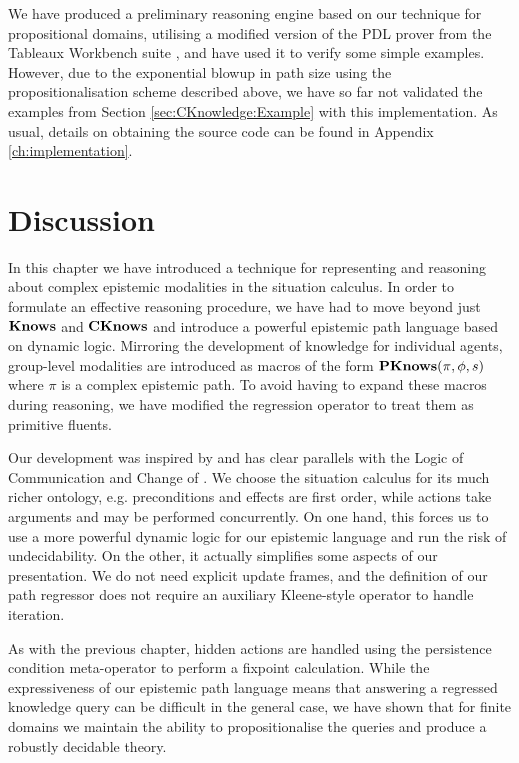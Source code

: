 We have produced a preliminary reasoning engine based on our technique
for propositional domains, utilising a modified version of the PDL
prover from the Tableaux Workbench suite \citep{abate07twb_pdl},
and have used it to verify some simple examples. However, due to the
exponential blowup in path size using the propositionalisation scheme
described above, we have so far not validated the examples from Section
\ref{sec:CKnowledge:Example} with this implementation. As usual,
details on obtaining the source code can be found in Appendix \ref{ch:implementation}.


\section{Discussion\label{sec:CKnowledge:Discussion}}

In this chapter we have introduced a technique for representing and
reasoning about complex epistemic modalities in the situation calculus.
In order to formulate an effective reasoning procedure, we have had
to move beyond just $\mathbf{Knows}$ and $\mathbf{CKnows}$ and introduce a powerful
epistemic path language based on dynamic logic. Mirroring the development
of knowledge for individual agents, group-level modalities are introduced
as macros of the form $\mathbf{PKnows}(\pi,\phi,s)$ where $\pi$ is a complex
epistemic path. To avoid having to expand these macros during reasoning,
we have modified the regression operator to treat them as primitive
fluents.

Our development was inspired by and has clear parallels with the Logic
of Communication and Change of \citet{vanBenthem06lcc}. We choose
the situation calculus for its much richer ontology, e.g. preconditions
and effects are first order, while actions take arguments and may
be performed concurrently. On one hand, this forces us to use a more
powerful dynamic logic for our epistemic language and run the risk
of undecidability. On the other, it actually simplifies some aspects
of our presentation. We do not need explicit update frames, and the
definition of our path regressor does not require an auxiliary Kleene-style
operator to handle iteration.

As with the previous chapter, hidden actions are handled using the
persistence condition meta-operator to perform a fixpoint calculation.
While the expressiveness of our epistemic path language means that
answering a regressed knowledge query can be difficult in the general
case, we have shown that for finite domains we maintain the ability
to propositionalise the queries and produce a robustly decidable theory.

